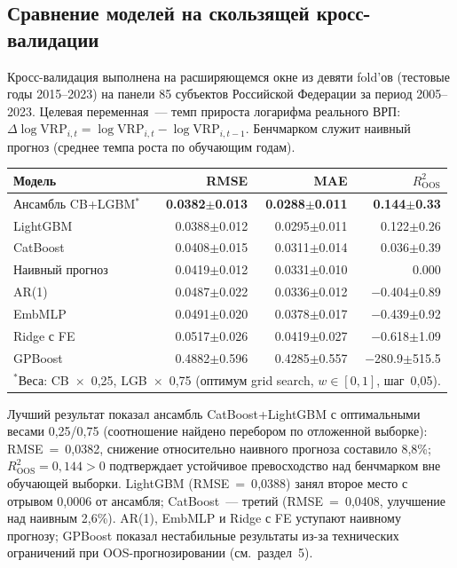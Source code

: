\documentclass[12pt,a4paper]{article}
\begin{document}
\subsection{Сравнение моделей на скользящей кросс-валидации}

Кросс-валидация выполнена на расширяющемся окне из девяти fold'ов
(тестовые годы 2015--2023) на панели 85 субъектов Российской Федерации
за период 2005--2023. Целевая переменная~--- темп прироста логарифма
реального ВРП: $\Delta\log\mathrm{VRP}_{i,t} = \log\mathrm{VRP}_{i,t} - \log\mathrm{VRP}_{i,t-1}$.
Бенчмарком служит наивный прогноз (среднее темпа роста по обучающим годам).

\begin{center}
\small
\begin{tabular}{lrrr}
\toprule
Модель & RMSE & MAE & $R^2_{\mathrm{OOS}}$ \\
\midrule
Ансамбль CB+LGBM$^*$ & \textbf{0.0382$\pm$0.013} & \textbf{0.0288$\pm$0.011} & \textbf{0.144$\pm$0.33} \\
LightGBM        & 0.0388$\pm$0.012 & 0.0295$\pm$0.011 & 0.122$\pm$0.26 \\
CatBoost        & 0.0408$\pm$0.015 & 0.0311$\pm$0.014 & 0.036$\pm$0.39 \\
Наивный прогноз & 0.0419$\pm$0.012 & 0.0331$\pm$0.010 & 0.000 \\
AR(1)           & 0.0487$\pm$0.022 & 0.0336$\pm$0.012 & $-$0.404$\pm$0.89 \\
EmbMLP          & 0.0491$\pm$0.020 & 0.0378$\pm$0.017 & $-$0.439$\pm$0.92 \\
Ridge с FE      & 0.0517$\pm$0.026 & 0.0419$\pm$0.027 & $-$0.618$\pm$1.09 \\
GPBoost         & 0.4882$\pm$0.596 & 0.4285$\pm$0.557 & $-$280.9$\pm$515.5 \\
\bottomrule
\multicolumn{4}{l}{\scriptsize $^*$Веса: CB~$\times$~0{,}25, LGB~$\times$~0{,}75 (оптимум grid search, $w\!\in\![0{,}1]$, шаг~0{,}05).}
\end{tabular}
\end{center}

Лучший результат показал ансамбль CatBoost+LightGBM с оптимальными
весами 0{,}25/0{,}75 (соотношение найдено перебором по отложенной выборке):
RMSE~=~0{,}0382, снижение относительно наивного прогноза составило 8{,}8\%;
$R^2_{\mathrm{OOS}} = 0{,}144 > 0$ подтверждает устойчивое превосходство над
бенчмарком вне обучающей выборки. LightGBM (RMSE~=~0{,}0388) занял второе
место с отрывом 0{,}0006 от ансамбля; CatBoost~--- третий
(RMSE~=~0{,}0408, улучшение над наивным 2{,}6\%). AR(1), EmbMLP и Ridge с FE
уступают наивному прогнозу; GPBoost показал нестабильные результаты
из-за технических ограничений при OOS-прогнозировании (см.~раздел~5).
\end{document}
